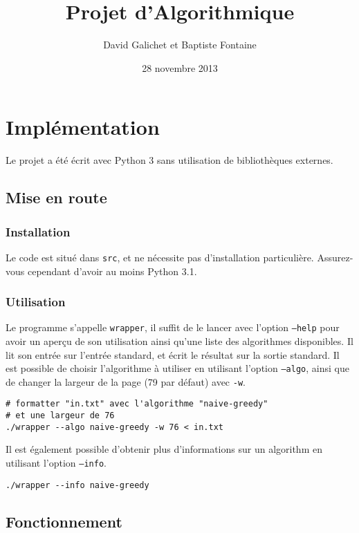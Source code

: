 \documentclass[]{article}
\begin{document}
\title{Projet d'Algorithmique}
\author{David Galichet et Baptiste Fontaine}
\date{28 novembre 2013}
\maketitle

\chapter{Implémentation}

Le projet a été écrit avec Python 3 sans utilisation de bibliothèques externes.

\section{Mise en route}
\subsection{Installation}

Le code est situé dans \texttt{src}, et ne nécessite pas d'installation
particulière. Assurez-vous cependant d'avoir au moins Python 3.1.

\subsection{Utilisation}

Le programme s'appelle \texttt{wrapper}, il suffit de le lancer avec l'option
\texttt{--help} pour avoir un aperçu de son utilisation ainsi qu'une liste des
algorithmes disponibles. Il lit son entrée sur l'entrée standard, et écrit le
résultat sur la sortie standard. Il est possible de choisir l'algorithme à
utiliser en utilisant l'option \texttt{--algo}, ainsi que de changer la largeur
de la page (79 par défaut) avec \texttt{-w}.

\begin{verbatim}
# formatter "in.txt" avec l'algorithme "naive-greedy"
# et une largeur de 76
./wrapper --algo naive-greedy -w 76 < in.txt
\end{verbatim}

Il est également possible d'obtenir plus d'informations sur un algorithm en
utilisant l'option \texttt{--info}.

\begin{verbatim}
./wrapper --info naive-greedy
\end{verbatim}

\section{Fonctionnement}
\end{document}
